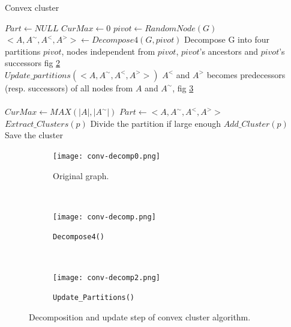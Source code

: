 \documentclass[10pt, conference, compsocconf,pdftex,dvipsnames]{IEEEtran}
\begin{document}
\begin{algorithm}[h!]
    \centering
    \caption{Convex cluster}
    \label{algo:conv-clust}
    \begin{algorithmic}[1]
        \State $Part \gets NULL$
        \State $CurMax \gets 0$
        \label{algop:main-loop}
        \State $pivot \gets RandomNode(G)$
        \State
        $<A,A^{\sim},A^<,A^>> \gets Decompose4(G,pivot)$\label{algop:init-part}
        \Comment Decompose G into four partitions 
        \Comment $pivot$, nodes independent from $pivot$, 
        \Comment $pivot$'s ancestors and $pivot$'s successors fig
        \ref{fig:conv-decomp1} 
        \\
        \State $Update\_partitions(<A,A^{\sim},A^<,A^>>)$
        \label{algop:update-part}
        \Comment $A^<$ and $A^>$ becomes predecessors 
        \Comment (resp. successors) of all nodes  
        \Comment from $A$ and $A^{\sim}$, fig 
        \ref{fig:conv-decomp2}
        \\
         \label{algop:part-choice}
        \\
        \State $CurMax \gets MAX(|A|,|A^{\sim}|)$
        \State $Part \gets <A,A^{\sim},A^<,A^>>$
        \EndIf
        \EndFor
        \label{algop:rec-stop}
        \State $Extract\_Clusters(p)$
        \Comment Divide the partition if large enough
        \Else
        \State $Add\_Cluster(p)$
        \Comment Save the cluster
        \EndIf
        \EndFor
        \EndFunction
    \end{algorithmic}
\end{algorithm}

\begin{figure}[t!]
    \centering
    \begin{subfigure}{0.22\textwidth}
        \centering
        \texttt{[image: conv-decomp0.png]}
        \caption{Original graph.}
        \label{fig:conv-decomp0}
    \end{subfigure}
    ~
    \begin{subfigure}{0.25\textwidth}
        \centering
        \texttt{[image: conv-decomp.png]}
        \caption{\texttt{Decompose4()}}
        \label{fig:conv-decomp1}
    \end{subfigure}
    ~
    \begin{subfigure}{0.25\textwidth}
        \centering
        \texttt{[image: conv-decomp2.png]}
        \caption{\texttt{Update\_Partitions()}}
        \label{fig:conv-decomp2}
    \end{subfigure}
    \caption{Decomposition and update step of convex cluster algorithm.}
    \label{fig:conv-decomp}
\end{figure}
\end{document}

